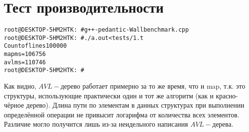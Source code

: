 \section{Тест производительности}

\begin{alltt}
root@DESKTOP-5HM2HTK:~# g++ -pedantic -Wall benchmark.cpp
root@DESKTOP-5HM2HTK:~# ./a.out <tests/1.t
Count of lines 100000
map ms=106756
avl ms=110746
root@DESKTOP-5HM2HTK:~#
\end{alltt}

Как видно, $AVL-$дерево работает примерно за то же время, что и map, т.к. это структуры, использующие практически один и тот же алгоритм (как и красно-чёрное дерево). Длина пути по элементам в данных структурах при выполнении определённой операции не привысит логарифма от количества всех элементов. Различие могло получится лишь из-за неидельного написания $AVL-$дерева.

\pagebreak

